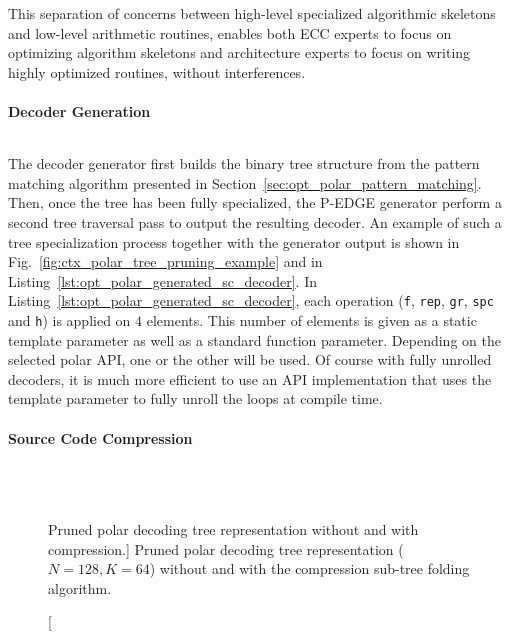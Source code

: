 This separation of concerns between high-level specialized algorithmic skeletons
and low-level arithmetic routines, enables both ECC experts to focus on
optimizing algorithm skeletons and architecture experts to focus on writing
highly optimized routines, without interferences.

\paragraph{Decoder Generation}

\begin{listing}[htp]
  \inputminted[frame=lines,linenos]{C++}{\curChapter/src/polar/generated_sc_decoder.cpp}
  \caption{The final code generated corresponding to the pruned tree in
    Fig.~\ref{fig:ctx_polar_tree_pruning_example}.}
  \label{lst:opt_polar_generated_sc_decoder}
\end{listing}

The decoder generator first builds the binary tree structure from the pattern
matching algorithm presented in Section~\ref{sec:opt_polar_pattern_matching}.
Then, once the tree has been fully specialized, the P-EDGE generator perform a
second tree traversal pass to output the resulting decoder. An example of such a
tree specialization process together with the generator output is shown in
Fig.~\ref{fig:ctx_polar_tree_pruning_example} and in
Listing~\ref{lst:opt_polar_generated_sc_decoder}. In
Listing~\ref{lst:opt_polar_generated_sc_decoder}, each operation (\verb|f|,
\verb|rep|, \verb|gr|, \verb|spc| and \verb|h|) is applied on $4$ elements. This
number of elements is given as a static template parameter as well as a standard
function parameter. Depending on the selected polar API, one or the other will
be used. Of course with fully unrolled decoders, it is much more efficient to
use an API implementation that uses the template parameter to fully unroll the
loops at compile time.

\paragraph{Source Code Compression}
\label{sec:opt_polar_sc_compression}

\begin{figure}[htp]
  \centering
  \\
  \\
  \caption
    [Pruned polar decoding tree representation without and with compression.]
    {Pruned polar decoding tree representation ($N = 128, K = 64$) without
    and with the compression sub-tree folding algorithm.}
  \label{fig:opt_polar_sc_gen_compression}
\end{figure}

